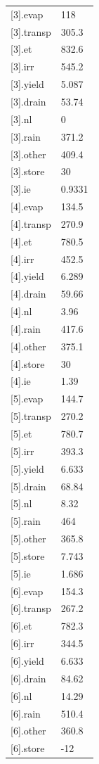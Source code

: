 {\begin{longtable}{p{}p{}}
{}[3].evap & 118\\
{}[3].transp & 305.3\\
{}[3].et & 832.6\\
{}[3].irr & 545.2\\
{}[3].yield & 5.087\\
{}[3].drain & 53.74\\
{}[3].nl & 0\\
{}[3].rain & 371.2\\
{}[3].other & 409.4\\
{}[3].store & 30\\
{}[3].ie & 0.9331\\
{}[4].evap & 134.5\\
{}[4].transp & 270.9\\
{}[4].et & 780.5\\
{}[4].irr & 452.5\\
{}[4].yield & 6.289\\
{}[4].drain & 59.66\\
{}[4].nl & 3.96\\
{}[4].rain & 417.6\\
{}[4].other & 375.1\\
{}[4].store & 30\\
{}[4].ie & 1.39\\
{}[5].evap & 144.7\\
{}[5].transp & 270.2\\
{}[5].et & 780.7\\
{}[5].irr & 393.3\\
{}[5].yield & 6.633\\
{}[5].drain & 68.84\\
{}[5].nl & 8.32\\
{}[5].rain & 464\\
{}[5].other & 365.8\\
{}[5].store & 7.743\\
{}[5].ie & 1.686\\
{}[6].evap & 154.3\\
{}[6].transp & 267.2\\
{}[6].et & 782.3\\
{}[6].irr & 344.5\\
{}[6].yield & 6.633\\
{}[6].drain & 84.62\\
{}[6].nl & 14.29\\
{}[6].rain & 510.4\\
{}[6].other & 360.8\\
{}[6].store & -12\\

\end{longtable}}
